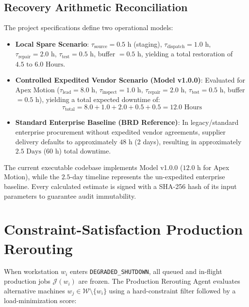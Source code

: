 \documentclass[10pt,twocolumn,a4paper]{article}
\begin{document}
\subsection{Recovery Arithmetic Reconciliation}
The project specifications define two operational models:
\begin{itemize}
    \item \textbf{Local Spare Scenario}: $\tau_{\text{source}} = 0.5\text{ h}$ (staging), $\tau_{\text{dispatch}} = 1.0\text{ h}$, $\tau_{\text{repair}} = 2.0\text{ h}$, $\tau_{\text{test}} = 0.5\text{ h}$, buffer $= 0.5\text{ h}$, yielding a total restoration of \textbf{$4.5\text{ to } 6.0\text{ Hours}$}.
    \item \textbf{Controlled Expedited Vendor Scenario (Model v1.0.0)}: Evaluated for Apex Motion ($\tau_{\text{lead}} = 8.0\text{ h}$, $\tau_{\text{inspect}} = 1.0\text{ h}$, $\tau_{\text{repair}} = 2.0\text{ h}$, $\tau_{\text{test}} = 0.5\text{ h}$, buffer $= 0.5\text{ h}$), yielding a total expected downtime of:
    \begin{equation}
        \tau_{\text{total}} = 8.0 + 1.0 + 2.0 + 0.5 + 0.5 = 12.0\text{ Hours}
    \end{equation}
    \item \textbf{Standard Enterprise Baseline (BRD Reference)}: In legacy/standard enterprise procurement without expedited vendor agreements, supplier delivery defaults to approximately $48\text{ h}$ (2 days), resulting in approximately \textbf{$2.5\text{ Days}$} ($60\text{ h}$) total downtime.
\end{itemize}
The current executable codebase implements Model v1.0.0 ($12.0\text{ h}$ for Apex Motion), while the $2.5\text{-day}$ timeline represents the un-expedited enterprise baseline. Every calculated estimate is signed with a SHA-256 hash of its input parameters to guarantee audit immutability.

\section{Constraint-Satisfaction Production Rerouting}
\label{sec:rerouting}
When workstation $w_i$ enters \texttt{DEGRADED\_SHUTDOWN}, all queued and in-flight production jobs $\mathcal{J}(w_i)$ are frozen. The Production Rerouting Agent evaluates alternative machines $w_j \in \mathcal{W} \setminus \{w_i\}$ using a hard-constraint filter followed by a load-minimization score:
\end{document}
